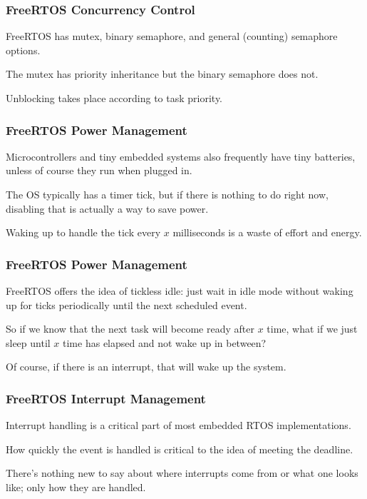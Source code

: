 \begin{frame}
\frametitle{FreeRTOS Concurrency Control}

FreeRTOS has mutex, binary semaphore, and general (counting) semaphore options.

The mutex has priority inheritance but the binary semaphore does not.

Unblocking takes place according to task priority.

\end{frame}



\begin{frame}
\frametitle{FreeRTOS Power Management}

Microcontrollers and tiny embedded systems also frequently have tiny batteries, unless of course they run when plugged in.

The OS typically has a timer tick, but if there is nothing to do right now, disabling that is actually a way to save power. 

Waking up to handle the tick every $x$ milliseconds is a waste of effort and energy.

\end{frame}

\begin{frame}
\frametitle{FreeRTOS Power Management}

FreeRTOS offers the idea of tickless idle: just wait in idle mode without waking up for ticks periodically until the next scheduled event. 

So if we know that the next task will become ready after $x$ time, what if we just sleep until $x$ time has elapsed and not wake up in between?

Of course, if there is an interrupt, that will wake up the system. 

\end{frame}


\begin{frame}
\frametitle{FreeRTOS Interrupt Management}

Interrupt handling is a critical part of most embedded RTOS implementations. 

How quickly the event is handled is critical to the idea of meeting the deadline. 

There's nothing new to say about where interrupts come from or what one looks like; only how they are handled.

\end{frame}



